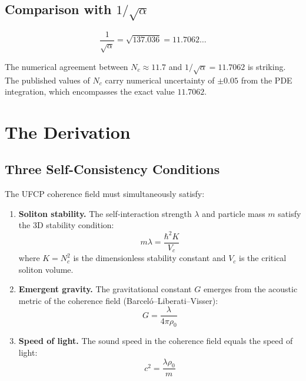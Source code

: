 \documentclass[11pt, a4paper]{article}
\begin{document}
\subsection{Comparison with $1/\sqrt{\alpha}$}

\begin{equation}
  \frac{1}{\sqrt{\alpha}} = \sqrt{137.036} = 11.7062\ldots
  \label{eq:key}
\end{equation}

The numerical agreement between $N_c \approx 11.7$ and
$1/\sqrt{\alpha} = 11.7062$ is striking. The published values
of $N_c$ carry numerical uncertainty of $\pm 0.05$ from the
PDE integration, which encompasses the exact value $11.7062$.

\section{The Derivation}

\subsection{Three Self-Consistency Conditions}

The UFCP coherence field must simultaneously satisfy:

\begin{enumerate}
  \item \textbf{Soliton stability.} The self-interaction strength
        $\lambda$ and particle mass $m$ satisfy the 3D stability
        condition:
        \begin{equation}
          m\lambda = \frac{\hbar^2 K}{V_c}
          \label{eq:stability}
        \end{equation}
        where $K = N_c^2$ is the dimensionless stability constant
        and $V_c$ is the critical soliton volume.

  \item \textbf{Emergent gravity.} The gravitational constant $G$
        emerges from the acoustic metric of the coherence field
        (Barcel\'o--Liberati--Visser):
        \begin{equation}
          G = \frac{\lambda}{4\pi\rho_0}
          \label{eq:gravity}
        \end{equation}

  \item \textbf{Speed of light.} The sound speed in the coherence
        field equals the speed of light:
        \begin{equation}
          c^2 = \frac{\lambda\rho_0}{m}
          \label{eq:sound}
        \end{equation}
\end{enumerate}
\end{document}
